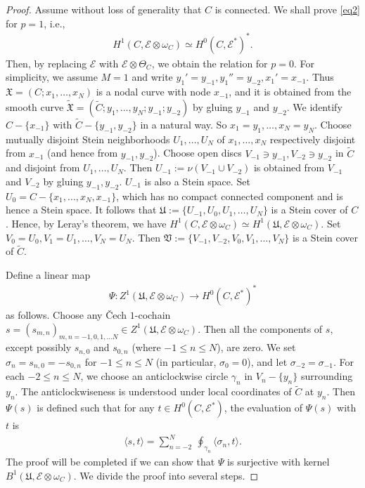 \documentclass[12pt,b5paper,notitlepage]{report}
\theoremstyle{definition}
\theoremstyle{plain}
\newcommand{\fk}{\mathfrak}
\newcommand{\wtd}{\widetilde}
\newcommand{\bk}[1]{\langle {#1}\rangle}
\newcommand{\scr}{\mathscr}
\numberwithin{equation}{section}
\begin{document}
\begin{proof}
Assume without loss of generality that $C$ is connected. We shall prove \eqref{eq2} for $p=1$, i.e., 
\begin{align*}
H^1(C,\scr E\otimes \omega_C)\simeq H^0(C,\scr E^*)^*.
\end{align*}
Then, by replacing $\scr E$ with $\scr E\otimes\Theta_C$, we obtain the relation for $p=0$. For simplicity, we assume $M=1$ and write $y_1'=y_{-1},y_1''=y_{-2},x_1'=x_{-1}$. Thus $\fk X=(C;x_1,\dots,x_N)$ is a nodal curve with node $x_{-1}$, and it is obtained from the smooth curve $\wtd{\fk X}=(\wtd C;y_1,\dots,y_N;y_{-1};y_{-2})$ by gluing $y_{-1}$ and $y_{-2}$. We identify $C-\{x_{-1}\}$ with $\wtd C-\{y_{-1},y_{-2}\}$ in a natural way. So $x_1=y_1,\dots,x_N=y_N$. Choose mutually disjoint Stein neighborhoods $U_1,\dots,U_N$ of $x_1,\dots,x_N$ respectively disjoint from $x_{-1}$ (and hence from $y_{-1},y_{-2}$). Choose open discs $V_{-1}\ni y_{-1},V_{-2}\ni y_{-2}$ in $\wtd C$ and disjoint from $U_1,\dots,U_N$. Then $U_{-1}:=\nu(V_{-1}\cup V_{-2})$ is obtained from $V_{-1}$ and $V_{-2}$ by gluing $y_{-1},y_{-2}$. $U_{-1}$ is also a Stein space. Set $U_0=C-\{x_1,\dots,x_N,x_{-1}\}$, which has no compact connected component and is hence a Stein space. It follows that $\fk U:=\{U_{-1},U_0,U_1,\dots,U_N\}$ is a Stein cover of $C$. Hence, by Leray's theorem, we have $H^1(C,\scr E\otimes \omega_C)\simeq H^1(\fk U,\scr E\otimes \omega_C)$. Set $V_0=U_0,V_1=U_1,\dots,V_N=U_N$. Then $\fk V:=\{V_{-1},V_{-2},V_0,V_1,\dots,V_N\}$ is a Stein cover of $\wtd C$. 

Define a linear map
\begin{align}
\Psi :Z^1(\fk U,\scr E\otimes\omega_C)\rightarrow H^0(C,\scr E^*)^*\label{eq219}
\end{align}
as follows. Choose any \v{C}ech $1$-cochain $s=(s_{m,n})_{m,n=-1,0,1,\dots N}\in Z^1(\fk U,\scr E\otimes\omega_C)$. Then all the components of $s$, except possibly $s_{n,0}$ and $s_{0,n}$ (where $-1\leq n\leq N$), are zero. We set $\sigma_n=s_{n,0}=-s_{0,n}$ for $-1\leq n\leq N$ (in particular, $\sigma_0=0$), and let $\sigma_{-2}=\sigma_{-1}$. For each $-2\leq n\leq N$, we choose an anticlockwise circle $\gamma_n$ in $V_n-\{y_n \}$ surrounding $y_n$. The anticlockwiseness is understood under local coordinates of $\wtd C$ at $y_n$. Then $\Psi(s)$ is defined such that for any $t\in H^0(C,\scr E^*)$, the evaluation of $\Psi(s)$ with $t$ is
\begin{align}
\bk{s,t}=\sum_{n=-2}^N~\oint_{\gamma_n}\bk{\sigma_n,t}.\label{eq157}
\end{align}
The proof will be completed if we can show that $\Psi$ is surjective with kernel $B^1(\fk U,\scr E\otimes\omega_C)$. We divide the proof into several steps.


\end{proof}
\end{document}
